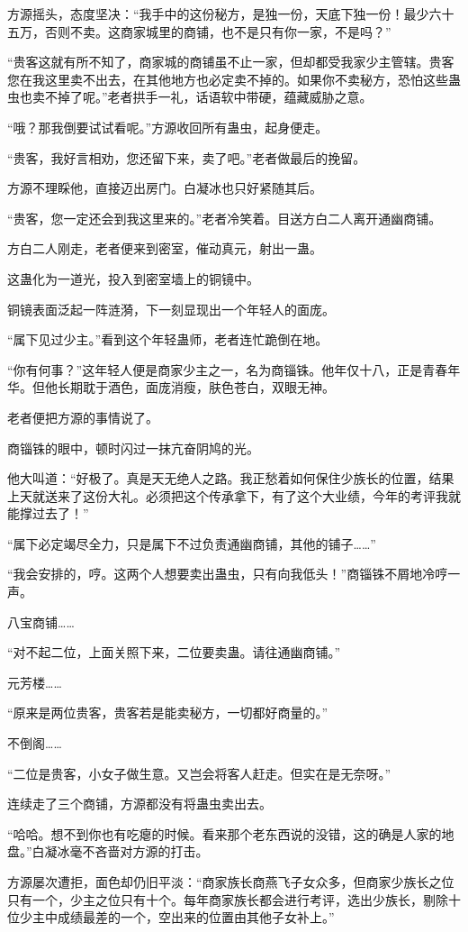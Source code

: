 \begin{this_body}
方源摇头，态度坚决：“我手中的这份秘方，是独一份，天底下独一份！最少六十五万，否则不卖。这商家城里的商铺，也不是只有你一家，不是吗？”

“贵客这就有所不知了，商家城的商铺虽不止一家，但却都受我家少主管辖。贵客您在我这里卖不出去，在其他地方也必定卖不掉的。如果你不卖秘方，恐怕这些蛊虫也卖不掉了呢。”老者拱手一礼，话语软中带硬，蕴藏威胁之意。

“哦？那我倒要试试看呢。”方源收回所有蛊虫，起身便走。

“贵客，我好言相劝，您还留下来，卖了吧。”老者做最后的挽留。

方源不理睬他，直接迈出房门。白凝冰也只好紧随其后。

“贵客，您一定还会到我这里来的。”老者冷笑着。目送方白二人离开通幽商铺。

方白二人刚走，老者便来到密室，催动真元，射出一蛊。

这蛊化为一道光，投入到密室墙上的铜镜中。

铜镜表面泛起一阵涟漪，下一刻显现出一个年轻人的面庞。

“属下见过少主。”看到这个年轻蛊师，老者连忙跪倒在地。

“你有何事？”这年轻人便是商家少主之一，名为商锱铢。他年仅十八，正是青春年华。但他长期耽于酒色，面庞消瘦，肤色苍白，双眼无神。

老者便把方源的事情说了。

商锱铢的眼中，顿时闪过一抹亢奋阴鸠的光。

他大叫道：“好极了。真是天无绝人之路。我正愁着如何保住少族长的位置，结果上天就送来了这份大礼。必须把这个传承拿下，有了这个大业绩，今年的考评我就能撑过去了！”

“属下必定竭尽全力，只是属下不过负责通幽商铺，其他的铺子……”

“我会安排的，哼。这两个人想要卖出蛊虫，只有向我低头！”商锱铢不屑地冷哼一声。

八宝商铺……

“对不起二位，上面关照下来，二位要卖蛊。请往通幽商铺。”

元芳楼……

“原来是两位贵客，贵客若是能卖秘方，一切都好商量的。”

不倒阁……

“二位是贵客，小女子做生意。又岂会将客人赶走。但实在是无奈呀。”

连续走了三个商铺，方源都没有将蛊虫卖出去。

“哈哈。想不到你也有吃瘪的时候。看来那个老东西说的没错，这的确是人家的地盘。”白凝冰毫不吝啬对方源的打击。

方源屡次遭拒，面色却仍旧平淡：“商家族长商燕飞子女众多，但商家少族长之位只有一个，少主之位只有十个。每年商家族长都会进行考评，选出少族长，剔除十位少主中成绩最差的一个，空出来的位置由其他子女补上。”


\end{this_body}
